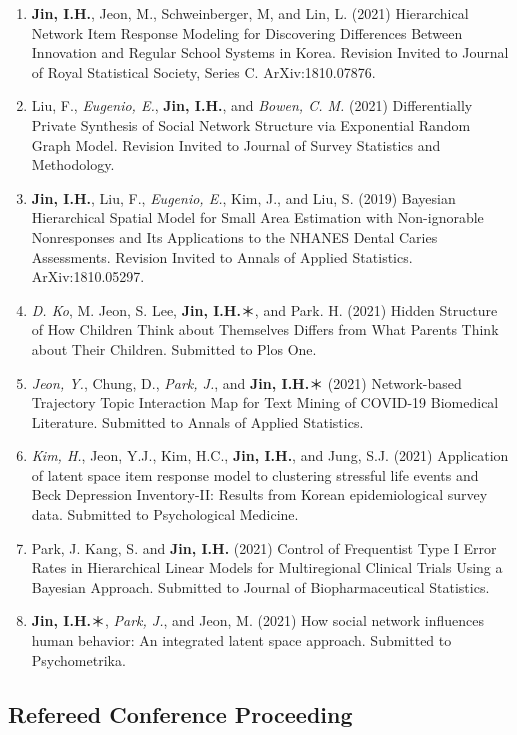 \documentclass[
]{book}
\begin{document}
\begin{enumerate}
\def\labelenumi{\arabic{enumi}.}
\item
  \textbf{Jin, I.H.}, Jeon, M., Schweinberger, M, and Lin, L. (2021) Hierarchical Network Item Response Modeling for Discovering Differences Between Innovation and Regular School Systems in Korea. Revision Invited to Journal of Royal Statistical Society, Series C. ArXiv:1810.07876.
\item
  Liu, F., \emph{Eugenio, E.}, \textbf{Jin, I.H.}, and \emph{Bowen, C. M.} (2021) Differentially Private Synthesis of Social Network Structure via Exponential Random Graph Model. Revision Invited to Journal of Survey Statistics and Methodology.
\item
  \textbf{Jin, I.H.}, Liu, F., \emph{Eugenio, E.}, Kim, J., and Liu, S. (2019) Bayesian Hierarchical Spatial Model for Small Area Estimation with Non-ignorable Nonresponses and Its Applications to the NHANES Dental Caries Assessments. Revision Invited to Annals of Applied Statistics. ArXiv:1810.05297.
\item
  \emph{D. Ko}, M. Jeon, S. Lee, \textbf{Jin, I.H.}＊, and Park. H. (2021) Hidden Structure of How Children Think about Themselves Differs from What Parents Think about Their Children. Submitted to Plos One.
\item
  \emph{Jeon, Y.}, Chung, D., \emph{Park, J.}, and \textbf{Jin, I.H.}＊ (2021) Network-based Trajectory Topic Interaction Map for Text Mining of COVID-19 Biomedical Literature. Submitted to Annals of Applied Statistics.
\item
  \emph{Kim, H.}, Jeon, Y.J., Kim, H.C., \textbf{Jin, I.H.}, and Jung, S.J. (2021) Application of latent space item response model to clustering stressful life events and Beck Depression Inventory-II: Results from Korean epidemiological survey data. Submitted to Psychological Medicine.
\item
  Park, J. Kang, S. and \textbf{Jin, I.H.} (2021) Control of Frequentist Type I Error Rates in Hierarchical Linear Models for Multiregional Clinical Trials Using a Bayesian Approach. Submitted to Journal of Biopharmaceutical Statistics.
\item
  \textbf{Jin, I.H.}＊, \emph{Park, J.}, and Jeon, M. (2021) How social network influences human behavior: An integrated latent space approach. Submitted to Psychometrika.
\end{enumerate}

\hypertarget{refereed-conference-proceeding}{%
\subsection*{Refereed Conference Proceeding}\label{refereed-conference-proceeding}}
\end{document}
